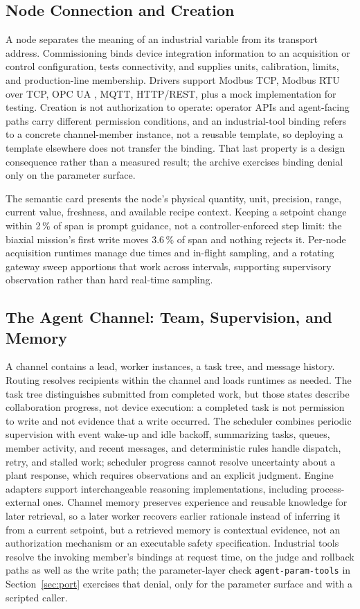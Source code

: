 \subsection{Node Connection and Creation}
\label{sec:nodes}
A node separates the meaning of an industrial variable from its transport address.
Commissioning binds device integration information to an acquisition or control
configuration, tests connectivity, and supplies units, calibration, limits, and
production-line membership. Drivers support Modbus TCP, Modbus RTU over TCP, OPC UA
\cite{iec62541}, MQTT, HTTP/REST, plus a mock implementation for testing. Creation
is not authorization to operate: operator APIs and agent-facing paths carry
different permission conditions, and an industrial-tool binding refers to a
concrete channel-member instance, not a reusable template, so deploying a template
elsewhere does not transfer the binding. That last property is a design consequence
rather than a measured result; the archive exercises binding denial only on the
parameter surface.

The semantic card presents the node's physical quantity, unit, precision, range,
current value, freshness, and available recipe context. Keeping a setpoint change
within 2\,\% of span is prompt guidance, not a controller-enforced step limit: the
biaxial mission's first write moves 3.6\,\% of span and nothing rejects it. Per-node
acquisition runtimes manage due times and in-flight sampling, and a rotating
gateway sweep apportions that work across intervals, supporting supervisory
observation rather than hard real-time sampling.

\subsection{The Agent Channel: Team, Supervision, and Memory}
\label{sec:channel}
A channel contains a lead, worker instances, a task tree, and message history.
Routing resolves recipients within the channel and loads runtimes as needed. The
task tree distinguishes submitted from completed work, but those states describe
collaboration progress, not device execution: a completed task is not permission to
write and not evidence that a write occurred. The scheduler combines periodic
supervision with event wake-up and idle backoff, summarizing tasks, queues, member
activity, and recent messages, and deterministic rules handle dispatch, retry, and
stalled work; scheduler progress cannot resolve uncertainty about a plant response,
which requires observations and an explicit judgment. Engine adapters support
interchangeable reasoning implementations, including process-external ones. Channel
memory preserves experience and reusable knowledge for later retrieval, so a later
worker recovers earlier rationale instead of inferring it from a current setpoint,
but a retrieved memory is contextual evidence, not an authorization mechanism or an
executable safety specification. Industrial tools resolve the invoking member's
bindings at request time, on the judge and rollback paths as well as the write path;
the parameter-layer check \texttt{agent-param-tools} in Section~\ref{sec:port}
exercises that denial, only for the parameter surface and with a scripted caller.

